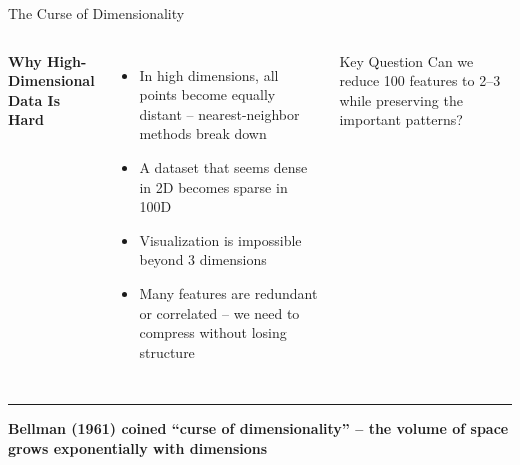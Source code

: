 \documentclass[8pt,aspectratio=169]{beamer}
\newcommand{\bottomnote}[1]{%
\vfill
\vspace{-2mm}
\textcolor{mllavender2}{\rule{\textwidth}{0.4pt}}
\vspace{1mm}
\footnotesize
\textbf{#1}
}
\newenvironment{compactlist}{%
  \begin{itemize}%
    \setlength{\itemsep}{2pt}%
    \setlength{\parskip}{0pt}%
    \setlength{\parsep}{0pt}%
}{%
  \end{itemize}%
}
\begin{document}
\begin{frame}[t]{The Curse of Dimensionality}
\begin{columns}[T]
\small
\textbf{Why High-Dimensional Data Is Hard}
\begin{compactlist}
\item In high dimensions, all points become equally distant -- nearest-neighbor methods break down
\item A dataset that seems dense in 2D becomes sparse in 100D
\item Visualization is impossible beyond 3 dimensions
\item Many features are redundant or correlated -- we need to compress without losing structure
\end{compactlist}

\begin{block}{Key Question}
\scriptsize Can we reduce 100 features to 2--3 while preserving the important patterns?
\end{block}

\vspace{4mm}
\end{columns}

\bottomnote{Bellman (1961) coined ``curse of dimensionality'' -- the volume of space grows exponentially with dimensions}
\end{frame}
\end{document}
